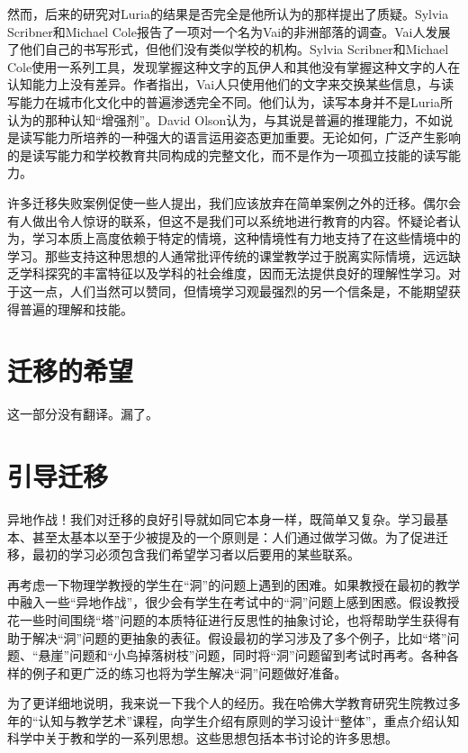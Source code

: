然而，后来的研究对Luria的结果是否完全是他所认为的那样提出了质疑。Sylvia Scribner和Michael Cole报告了一项对一个名为Vai的非洲部落的调查。Vai人发展了他们自己的书写形式，但他们没有类似学校的机构。Sylvia Scribner和Michael Cole使用一系列工具，发现掌握这种文字的瓦伊人和其他没有掌握这种文字的人在认知能力上没有差异。作者指出，Vai人只使用他们的文字来交换某些信息，与读写能力在城市化文化中的普遍渗透完全不同。他们认为，读写本身并不是Luria所认为的那种认知“增强剂”。David Olson认为，与其说是普遍的推理能力，不如说是读写能力所培养的一种强大的语言运用姿态更加重要。无论如何，广泛产生影响的是读写能力和学校教育共同构成的完整文化，而不是作为一项孤立技能的读写能力。

许多迁移失败案例促使一些人提出，我们应该放弃在简单案例之外的迁移。偶尔会有人做出令人惊讶的联系，但这不是我们可以系统地进行教育的内容。怀疑论者认为，学习本质上高度依赖于特定的情境，这种情境性有力地支持了在这些情境中的学习。那些支持这种思想的人通常批评传统的课堂教学过于脱离实际情境，远远缺乏学科探究的丰富特征以及学科的社会维度，因而无法提供良好的理解性学习。对于这一点，人们当然可以赞同，但情境学习观最强烈的另一个信条是，不能期望获得普遍的理解和技能。

\section*{迁移的希望}

这一部分没有翻译。漏了。

\section*{引导迁移}

异地作战！我们对迁移的良好引导就如同它本身一样，既简单又复杂。学习最基本、甚至太基本以至于少被提及的一个原则是：人们通过做学习做。为了促进迁移，最初的学习必须包含我们希望学习者以后要用的某些联系。

再考虑一下物理学教授的学生在“洞”的问题上遇到的困难。如果教授在最初的教学中融入一些“异地作战”，很少会有学生在考试中的“洞”问题上感到困惑。假设教授花一些时间围绕“塔”问题的本质特征进行反思性的抽象讨论，也将帮助学生获得有助于解决“洞”问题的更抽象的表征。假设最初的学习涉及了多个例子，比如“塔”问题、“悬崖”问题和“小鸟掉落树枝”问题，同时将“洞”问题留到考试时再考。各种各样的例子和更广泛的练习也将为学生解决“洞”问题做好准备。

为了更详细地说明，我来说一下我个人的经历。我在哈佛大学教育研究生院教过多年的“认知与教学艺术”课程，向学生介绍有原则的学习设计“整体”，重点介绍认知科学中关于教和学的一系列思想。这些思想包括本书讨论的许多思想。

